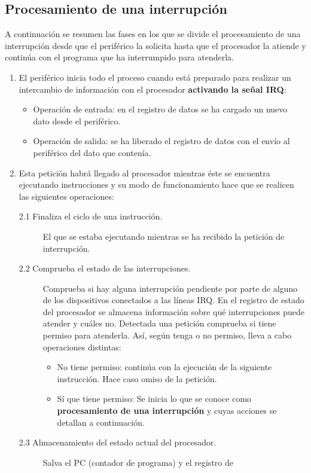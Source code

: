 \subsection{Procesamiento de una interrupción}
A continuación se resumen las fases en los que se divide el  procesamiento de una interrupción desde que el periférico la solicita hasta que el procesador la atiende y continúa con el programa que ha interrumpido para atenderla.
\begin{enumerate}
	\item El periférico inicia todo el proceso cuando está preparado para realizar un intercambio de información con el procesador  {\bf activando la señal IRQ}:
	\begin{itemize}
		\item Operación de entrada:   en el registro de datos se ha cargado un nuevo dato desde el periférico. 
		\item Operación de salida: se ha liberado el registro de datos con el envío al periférico del dato que contenía.  
	\end{itemize}
	\item Esta petición habrá llegado al procesador mientras éste  se encuentra ejecutando instrucciones y su modo de funcionamiento hace que se realicen las siguientes operaciones: 
	\begin{description}
		\item  [2.1 Finaliza el ciclo de una instrucción.] El que se estaba ejecutando mientras se ha recibido la petición de interrupción.  
		\item [2.2 Comprueba el estado de las interrupciones.] Comprueba si hay alguna interrupción pendiente por parte de alguno de los dispositivos conectados a las líneas IRQ.
		En el registro de estado del procesador se almacena información sobre qué interrupciones  puede atender y cuáles no. Detectada una petición comprueba si tiene permiso para  atenderla.  Así, según tenga o no permiso, lleva a cabo operaciones distintas:
		\begin{itemize}
			\item No tiene permiso: continúa con la ejecución de la siguiente instrucción. Hace caso omiso de la petición. 
			\item Sí que tiene permiso: Se inicia lo que se conoce como {\bf procesamiento de una interrupción} y cuyas acciones se detallan a continuación.
		\end{itemize}
		\item [2.3 Almacenamiento del estado actual del procesador.] Salva el PC (contador de programa) y el registro de

\end{description}
\end{enumerate}
